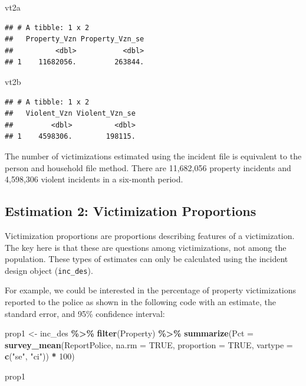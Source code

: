 \documentclass[
]{krantz}
\makeatletter
\newenvironment{Shaded}{\begin{snugshade}}{\end{snugshade}}
\newcommand{\AttributeTok}[1]{\textcolor[rgb]{0.27,0.27,0.27}{#1}}
\newcommand{\ConstantTok}[1]{\textcolor[rgb]{0.37,0.37,0.37}{#1}}
\newcommand{\DecValTok}[1]{\textcolor[rgb]{0.06,0.06,0.06}{#1}}
\newcommand{\FunctionTok}[1]{\textcolor[rgb]{0.27,0.27,0.27}{\textbf{#1}}}
\newcommand{\NormalTok}[1]{#1}
\newcommand{\OtherTok}[1]{\textcolor[rgb]{0.37,0.37,0.37}{#1}}
\newcommand{\SpecialCharTok}[1]{\textcolor[rgb]{0.43,0.43,0.43}{\textbf{#1}}}
\newcommand{\StringTok}[1]{\textcolor[rgb]{0.5,0.5,0.5}{#1}}
\newenvironment{kframe}{%
\medskip{}
\setlength{\fboxsep}{.8em}
 \def\at@end@of@kframe{}%
 \ifinner\ifhmode%
  \def\at@end@of@kframe{\end{minipage}}%
  \begin{minipage}{\columnwidth}%
 \fi\fi%
 \def\FrameCommand##1{\hskip\@totalleftmargin \hskip-\fboxsep
 \colorbox{shadecolor}{##1}\hskip-\fboxsep
     \hskip-\linewidth \hskip-\@totalleftmargin \hskip\columnwidth}%
 \MakeFramed {\advance\hsize-\width
   \@totalleftmargin\z@ \linewidth\hsize
   \@setminipage}}%
 {\par\unskip\endMakeFramed%
 \at@end@of@kframe}
\renewenvironment{Shaded}{\begin{kframe}}{\end{kframe}}
\makeatother
\begin{document}
\begin{Shaded}
\begin{Highlighting}[]
\NormalTok{vt2a}
\end{Highlighting}
\end{Shaded}

\begin{verbatim}
## # A tibble: 1 x 2
##   Property_Vzn Property_Vzn_se
##          <dbl>           <dbl>
## 1    11682056.         263844.
\end{verbatim}

\begin{Shaded}
\begin{Highlighting}[]
\NormalTok{vt2b}
\end{Highlighting}
\end{Shaded}

\begin{verbatim}
## # A tibble: 1 x 2
##   Violent_Vzn Violent_Vzn_se
##         <dbl>          <dbl>
## 1    4598306.        198115.
\end{verbatim}

The number of victimizations estimated using the incident file is equivalent to the person and household file method. There are 11,682,056 property incidents and 4,598,306 violent incidents in a six-month period.

\hypertarget{vic-prop}{%
\subsection{Estimation 2: Victimization Proportions}\label{vic-prop}}

Victimization proportions are proportions describing features of a victimization. The key here is that these are questions among victimizations, not among the population. These types of estimates can only be calculated using the incident design object (\texttt{inc\_des}).

For example, we could be interested in the percentage of property victimizations reported to the police as shown in the following code with an estimate, the standard error, and 95\% confidence interval:

\begin{Shaded}
\begin{Highlighting}[]
\NormalTok{prop1 }\OtherTok{\textless{}{-}}\NormalTok{ inc\_des }\SpecialCharTok{\%\textgreater{}\%}
  \FunctionTok{filter}\NormalTok{(Property) }\SpecialCharTok{\%\textgreater{}\%}
  \FunctionTok{summarize}\NormalTok{(}\AttributeTok{Pct =} \FunctionTok{survey\_mean}\NormalTok{(ReportPolice, }\AttributeTok{na.rm =} \ConstantTok{TRUE}\NormalTok{, }\AttributeTok{proportion =} \ConstantTok{TRUE}\NormalTok{, }\AttributeTok{vartype =} \FunctionTok{c}\NormalTok{(}\StringTok{"se"}\NormalTok{, }\StringTok{"ci"}\NormalTok{)) }\SpecialCharTok{*} \DecValTok{100}\NormalTok{)}

\NormalTok{prop1}
\end{Highlighting}
\end{Shaded}
\end{document}
